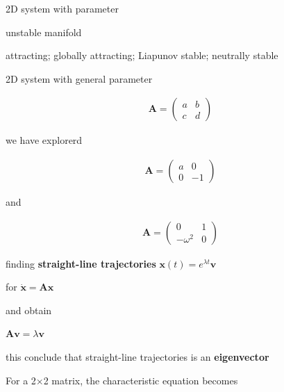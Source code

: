\documentclass[9pt,aspectratio=43,mathserif,table]{beamer}
\begin{document}
\begin{frame}{2D system with parameter }
\begin{multicols}{2}
    unstable manifold
 \end{multicols}
 attracting;  globally attracting; 
 Liapunov stable;  neutrally stable
\end{frame}
\begin{frame}{2D system with general parameter}
  \begin{multicols}{2}

    \begin{equation*}
      \begin{aligned}
      \symbf{A} = 
        \begin{pmatrix}
          a & b \\
          c & d
        \end{pmatrix}
      \end{aligned}
    \end{equation*}

    we have explorerd

    \begin{equation*}
      \begin{aligned}
      \symbf{A} = 
        \begin{pmatrix}
          a & 0 \\
          0 & -1
        \end{pmatrix}
      \end{aligned}
    \end{equation*}

    and

    \begin{equation*}
      \begin{aligned}
      \symbf{A} = 
        \begin{pmatrix}
          0 & 1 \\
          -\omega^2  & 0
        \end{pmatrix}
      \end{aligned}
    \end{equation*}




    finding \textbf{straight-line trajectories} $\symbf{x}(t) = e^{\lambda t}\symbf{\symbf{v}}$

    for $\symbf{\dot {x}} =  \symbf{Ax}$

    and obtain

    $\symbf{Av}= \lambda \symbf{v}$

    this conclude that straight-line trajectories is an \textbf{eigenvector}

    For a 2$\times$2 matrix, the characteristic equation becomes



\end{multicols}
\end{frame}
\end{document}
